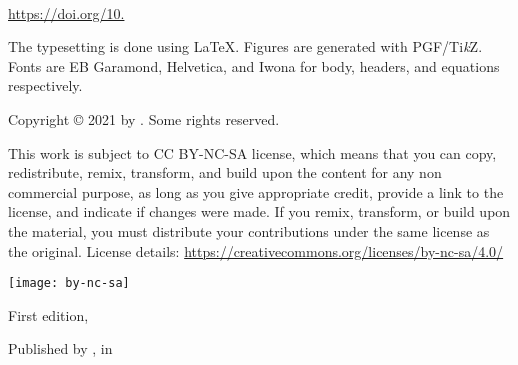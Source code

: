 
{\small\setlength{\parindent}{0em}\setlength{\parskip}{1em}
~

\vfill

\url{https://doi.org/10.}

The typesetting is done using \LaTeX. Figures are generated with PGF/Ti\textit{k}Z. Fonts are EB Garamond, Helvetica, and Iwona for body, headers, and equations respectively.

Copyright \copyright{} 2021 by \authorname. Some rights reserved.

This work is subject to CC BY-NC-SA license, which means that you can copy, redistribute, remix, transform, and build upon the content for any non commercial purpose, as long as you give appropriate credit, provide a link to the license, and indicate if changes were made. If you remix, transform, or build upon the material, you must distribute your contributions under the same license as the original. License details: \url{https://creativecommons.org/licenses/by-nc-sa/4.0/}

\texttt{[image: by-nc-sa]}

First edition, \editionyear{}


Published by \publisher{}, in \place{}
}\cleardoublepage
